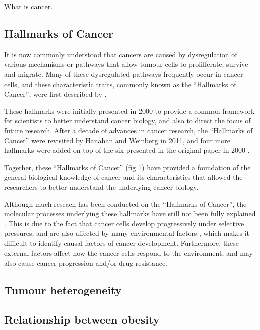 What is cancer.

\subsection{Hallmarks of Cancer}
\label{subsec:cancerhallmarks}

It is now commonly understood that cancers are caused by dysregulation of various mechanisms or pathways that allow tumour cells to prolilferate, survive and migrate.
Many of these dysregulated pathways frequently occur in cancer cells, and these characteristic traits, commonly known as the ``Hallmarks of Cancer'', were first described by \citet{Hanahan2000}.

These hallmarks were initially presented in 2000 to provide a common framework for scientists to better understand cancer biology, and also to direct the focus of future research.
After a decade of advances in cancer research, the ``Hallmarks of Cancer'' were revisited by Hanahan and Weinberg in 2011, and four more hallmarks were added on top of the six presented in the original paper in 2000 \citep{Hanahan2011}.

Together, these ``Hallmarks of Cancer'' (fig 1) have provided a foundation of the general biological knowledge of cancer and its characteristics that allowed the researchers to better understand the underlying cancer biology.

Although much reseach has been conducted on the ``Hallmarks of Cancer'', the molecular processes underlying these hallmarks have still not been fully explained \citep{Hanahan2011}.
This is due to the fact that cancer cells develop progressively under selective pressures, and are also affected by many environmental factors \citep{Gatza2011}, which makes it difficult to identify causal factors of cancer development.
Furthermore, these external factors affect how the cancer cells respond to the environment, and may also cause cancer progression and/or drug resistance.

\subsection{Tumour heterogeneity}
\label{sub:tumour_heterogeneity}




\subsection{Relationship between obesity}
\label{subsec:obsbackground}

